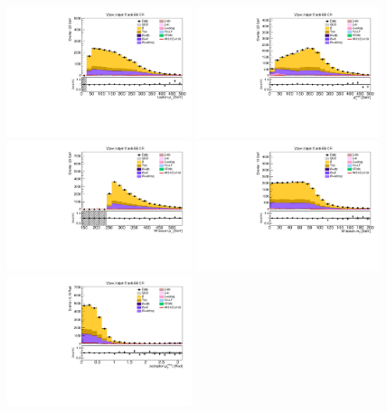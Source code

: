 \begin{figure}[tbp]
  \begin{center}
    \includegraphics[width=0.48\textwidth]{figures/wlnhbb2016/boosted/WenWHTT1bFJCR_lepton1Pt.pdf}
    \includegraphics[width=0.48\textwidth]{figures/wlnhbb2016/boosted/WenWHTT1bFJCR_pfmet.pdf}
    \includegraphics[width=0.48\textwidth]{figures/wlnhbb2016/boosted/WenWHTT1bFJCR_topWBosonPt.pdf}
    \includegraphics[width=0.48\textwidth]{figures/wlnhbb2016/boosted/WenWHTT1bFJCR_mT.pdf}
    \includegraphics[width=0.48\textwidth]{figures/wlnhbb2016/boosted/WenWHTT1bFJCR_deltaPhiLep1Met.pdf}

\end{center}
\end{figure}
